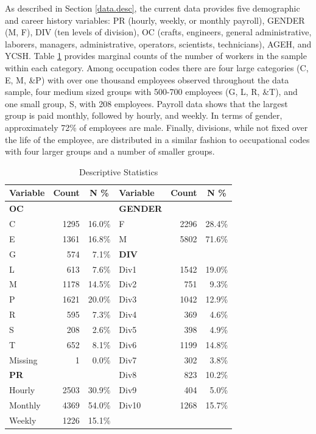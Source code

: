 As described in Section \ref{data.desc}, the current data provides five demographic and career history variables: PR (hourly, weekly, or monthly payroll), GENDER (M, F), DIV (ten levels of division), OC (crafts, engineers, general administrative, laborers, managers, administrative, operators, scientists, technicians), AGEH, and YCSH. Table \ref{tab:descriptive} provides marginal counts of the number of workers in the sample within each category.  Among occupation codes there are four large categories (C, E, M, \&P)  with over one thousand employees observed throughout the data sample, four medium sized groups with 500-700 employees (G, L, R, \&T), and one small group, S, with 208 employees.  Payroll data shows that the largest group is paid monthly, followed by hourly, and weekly.  In terms of gender, approximately 72\% of employees are male. Finally, divisions, while not fixed over the life of the employee, are distributed in a similar fashion to occupational codes with four larger groups and a number of smaller groups.
\begin{table}[htbp]
	\centering
	\scriptsize
	\renewcommand{\arraystretch}{1.5}
	\caption{Descriptive Statistics}
	\begin{tabular}{lrrlrr}
		\toprule
		\textbf{Variable}	& \multicolumn{1}{c}{\textbf{Count}} & \multicolumn{1}{c}{\textbf{N \%}}  &   \textbf{Variable}    & \multicolumn{1}{c}{\textbf{Count}} & \multicolumn{1}{c}{\textbf{N \%}} \\
		\midrule
		\textbf{OC} &       &       & \textbf{GENDER} &       &  \\
		C     & 1295  & 16.0\% & F     & 2296  & 28.4\% \\
		E     & 1361  & 16.8\% & M     & 5802  & 71.6\% \\
		G     & 574   & 7.1\% & \textbf{DIV} &       &  \\
		L     & 613   & 7.6\% & Div1 & 1542  & 19.0\% \\
		M     & 1178  & 14.5\% & Div2 & 751   & 9.3\% \\
		P     & 1621  & 20.0\% & Div3 & 1042  & 12.9\% \\
		R     & 595   & 7.3\% & Div4 & 369   & 4.6\% \\
		S     & 208   & 2.6\% & Div5 & 398   & 4.9\% \\
		T     & 652   & 8.1\% & Div6 & 1199  & 14.8\% \\
		Missing & 1     & 0.0\% & Div7 & 302   & 3.8\% \\
		\textbf{PR} &  &   & Div8 & 823   & 10.2\% \\
		Hourly & 2503  & 30.9\% & Div9 & 404   & 5.0\% \\
		Monthly & 4369  & 54.0\% & Div10 & 1268  & 15.7\% \\
		Weekly & 1226  & 15.1\% &       &       &  \\
		\bottomrule
	\end{tabular}%
	\label{tab:descriptive}%
\end{table}%

